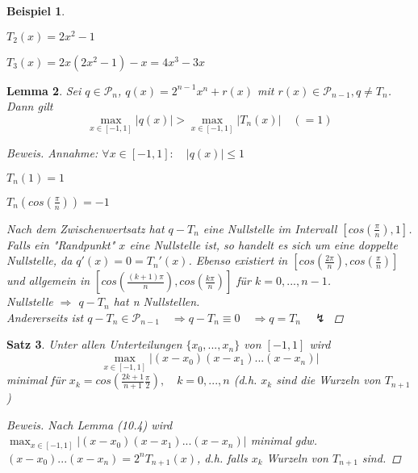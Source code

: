 \documentclass[12pt]{article}
\theoremstyle{break}
\newtheorem{theorem}{Satz}[subsection]
\newtheorem{lemma}[theorem]{Lemma}
\newtheorem{example}[theorem]{Beispiel}
\begin{document}
\begin{example} \leavevmode
\begin{description}
  \item $T_2(x) = 2x^2 - 1$
  \item $T_3(x) = 2x(2x^2 -1) - x = 4x^3 -3x$
\end{description}
\end{example}

\begin{lemma}
Sei $q \in \mathcal{P}_n$, $q(x) = 2^{n-1} x^n + r(x)$ mit $r(x) \in \mathcal{P}_{n-1}, q \neq T_n$. Dann gilt
\[ \max_{x\in [-1, 1]} \vert q(x) \vert > \max_{x\in [-1, 1]} \vert T_n(x) \vert \quad(=1)\]

\begin{proof}[Beweis]\leavevmode
Annahme: $\forall x \in [-1, 1]: \quad \vert q(x) \vert \leq 1$
\begin{description}
  \item $T_n(1) = 1$
  \item $T_n(cos(\frac{\pi}{n})) = -1$
\end{description}
Nach dem Zwischenwertsatz hat $q-T_n$ eine Nullstelle im Intervall $[cos(\frac{\pi}{n}), 1]$. Falls ein "Randpunkt" $x$ eine Nullstelle ist, so handelt es sich um eine doppelte Nullstelle, da $q'(x) = 0 = T_n'(x)$. Ebenso existiert in $[cos(\frac{2\pi}{n}), cos(\frac{\pi}{n})]$ und allgemein in $[cos(\frac{(k+1)\pi}{n}), cos(\frac{k\pi}{n})]$ für $k=0,...,n-1$.\\
Nullstelle $\Rightarrow$ $q-T_n$ hat n Nullstellen.\\
Andererseits ist $q-T_n \in \mathcal{P}_{n-1} \quad \Rightarrow q-T_n \equiv 0 \quad \Rightarrow q = T_n \quad \lightning$
\end{proof}
\end{lemma}

\begin{theorem}
Unter allen Unterteilungen $\{x_0,...,x_n\}$ von $[-1,1]$ wird 
$$ \max_{x \in [-1, 1]} \vert (x-x_0)(x-x_1)...(x-x_n) \vert $$
minimal für $x_k = cos\left( \frac{2k+1}{n+1} \frac{\pi}{2}\right), \quad k=0,...,n$ (d.h. $x_k$ sind die Wurzeln von $T_{n+1}$)

\begin{proof}[Beweis]
Nach Lemma (10.4) wird $\max_{x \in [-1, 1]} \vert (x-x_0)(x-x_1)...(x-x_n) \vert$ minimal gdw.  $(x-x_0)...(x-x_n) = 2^{n} T_{n+1}(x)$, d.h. falls $x_k$ Wurzeln von $T_{n+1}$ sind.
\end{proof}
\end{theorem}
\end{document}

